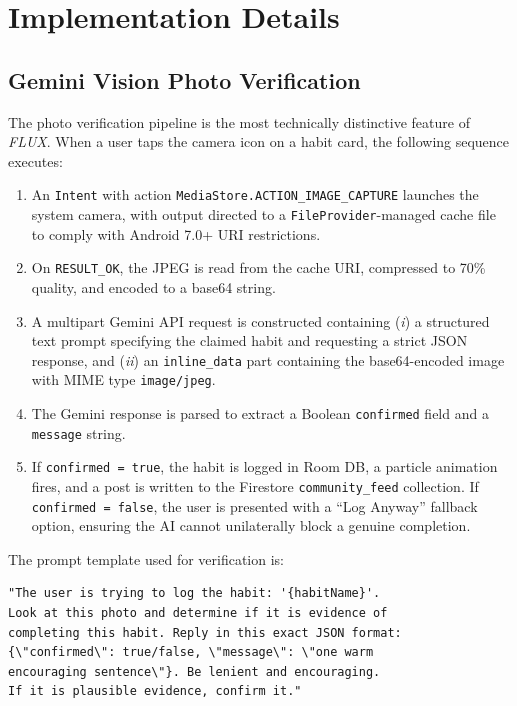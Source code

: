 \documentclass[12pt,a4paper]{article}
\newcommand{\FL}{\textit{FLUX}}
\begin{document}
\section{Implementation Details}

\subsection{Gemini Vision Photo Verification}

The photo verification pipeline is the most technically distinctive feature of
\FL{}. When a user taps the camera icon on a habit card, the following sequence
executes:

\begin{enumerate}[leftmargin=1.5em]
    \item An \texttt{Intent} with action \texttt{MediaStore.ACTION\_IMAGE\_CAPTURE}
    launches the system camera, with output directed to a \texttt{FileProvider}-managed
    cache file to comply with Android 7.0+ URI restrictions.
    \item On \texttt{RESULT\_OK}, the JPEG is read from the cache URI, compressed to
    70\% quality, and encoded to a base64 string.
    \item A multipart Gemini API request is constructed containing (\textit{i}) a
    structured text prompt specifying the claimed habit and requesting a strict JSON
    response, and (\textit{ii}) an \texttt{inline\_data} part containing the
    base64-encoded image with MIME type \texttt{image/jpeg}.
    \item The Gemini response is parsed to extract a Boolean \texttt{confirmed} field
    and a \texttt{message} string.
    \item If \texttt{confirmed = true}, the habit is logged in Room DB, a particle
    animation fires, and a post is written to the Firestore \texttt{community\_feed}
    collection. If \texttt{confirmed = false}, the user is presented with a ``Log
    Anyway'' fallback option, ensuring the AI cannot unilaterally block a genuine
    completion.
\end{enumerate}

The prompt template used for verification is:

\begin{lstlisting}[language={}]
"The user is trying to log the habit: '{habitName}'.
Look at this photo and determine if it is evidence of
completing this habit. Reply in this exact JSON format:
{\"confirmed\": true/false, \"message\": \"one warm
encouraging sentence\"}. Be lenient and encouraging.
If it is plausible evidence, confirm it."
\end{lstlisting}
\end{document}
